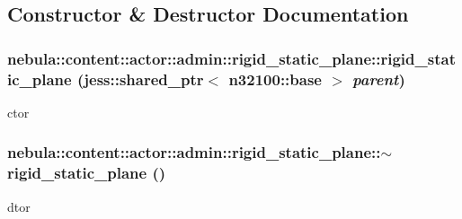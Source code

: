 \subsection{Constructor \& Destructor Documentation}
\hypertarget{classnebula_1_1content_1_1actor_1_1admin_1_1rigid__static__plane_a5b9619b49e19829a3b5a3d95023572d2}{
\subsubsection[{rigid\_\-static\_\-plane}]{\setlength{\rightskip}{0pt plus 5cm}nebula::content::actor::admin::rigid\_\-static\_\-plane::rigid\_\-static\_\-plane (jess::shared\_\-ptr$<$ {\bf n32100::base} $>$ {\em parent})}}
\label{classnebula_1_1content_1_1actor_1_1admin_1_1rigid__static__plane_a5b9619b49e19829a3b5a3d95023572d2}


ctor \hypertarget{classnebula_1_1content_1_1actor_1_1admin_1_1rigid__static__plane_ab4861570d09eed728307ba6dc942e8ea}{
\subsubsection[{$\sim$rigid\_\-static\_\-plane}]{\setlength{\rightskip}{0pt plus 5cm}nebula::content::actor::admin::rigid\_\-static\_\-plane::$\sim$rigid\_\-static\_\-plane ()}}
\label{classnebula_1_1content_1_1actor_1_1admin_1_1rigid__static__plane_ab4861570d09eed728307ba6dc942e8ea}


dtor 

